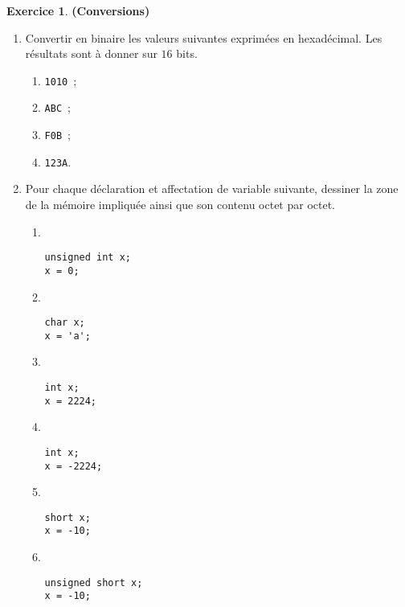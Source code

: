 \documentclass[12pt]{article}
\theoremstyle{definition}
\newtheorem{Exercice}{Exercice}
\begin{document}
\begin{Exercice} {\bf (Conversions)}
\begin{enumerate}
    \item Convertir en binaire les valeurs suivantes exprimées en
    hexadécimal. Les résultats sont à donner sur $16$ bits.
    \begin{multicols}{2}
    \begin{enumerate}
        \item {\tt 1010}~;
        \item {\tt ABC}~;
        \item {\tt F0B}~;
        \item {\tt 123A}.
    \end{enumerate}
    \end{multicols}

    \item Pour chaque déclaration et affectation de variable suivante,
    dessiner la zone de la mémoire impliquée ainsi que son contenu octet
    par octet.
    \begin{multicols}{3}
    \begin{enumerate}
        \item ~
\begin{lstlisting}
unsigned int x;
x = 0;
\end{lstlisting}
        \smallskip

        \item ~
\begin{lstlisting}
char x;
x = 'a';
\end{lstlisting}
        \smallskip

        \item ~
\begin{lstlisting}
int x;
x = 2224;
\end{lstlisting}
        \smallskip

        \item ~
\begin{lstlisting}
int x;
x = -2224;
\end{lstlisting}
        \smallskip

        \item ~
\begin{lstlisting}
short x;
x = -10;
\end{lstlisting}
        \smallskip

        \item ~
\begin{lstlisting}
unsigned short x;
x = -10;
\end{lstlisting}
        \smallskip

    \end{enumerate}
    \end{multicols}
\end{enumerate}
\end{Exercice}
\bigskip
\end{document}

